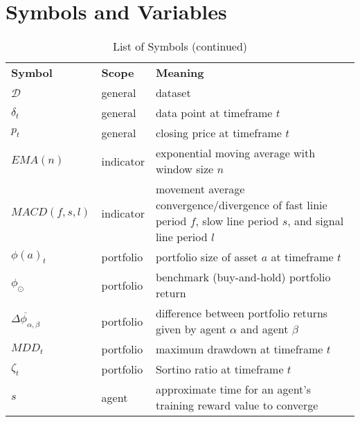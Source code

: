 \chapter{Symbols and Variables}
    \label{appx:label1}
   
    \begin{longtable}{p{2.2cm}|p{2cm}|p{9cm}}
	\caption{List of Symbols}
		\endfirsthead
		\caption[]{List of Symbols (continued)}\\
		\endhead

	\label{app-symbol}
	\textbf{Symbol} & \textbf{Scope} & \textbf{Meaning} \\ \hline
	$\mathcal{D}$ & general & dataset \\
	$\delta_t$ & general & data point at timeframe $t$ \\
	$p_t$ & general & closing price at timeframe $t$ \\
	$EMA(n)$ & indicator & exponential moving average with window size $n$ \\
	$MACD(f, s, l)$ & indicator & movement average convergence/divergence of fast linie period $f$, slow line period $s$, and signal line period $l$ \\
	$\phi(a)_t$ & portfolio & portfolio size of asset $a$ at timeframe $t$ \\
	$\phi_\odot$ & portfolio & benchmark (buy-and-hold) portfolio return \\
	$\overline{\Delta\phi_{\alpha,\beta}}$ & portfolio & difference between portfolio returns given by agent $\alpha$ and agent $\beta$ \\
	$MDD_t$ & portfolio & maximum drawdown at timeframe $t$ \\
	$\zeta_t$ & portfolio & Sortino ratio at timeframe $t$ \\
	$s$ & agent & approximate time for an agent's training reward value to converge\\

	\end{longtable}